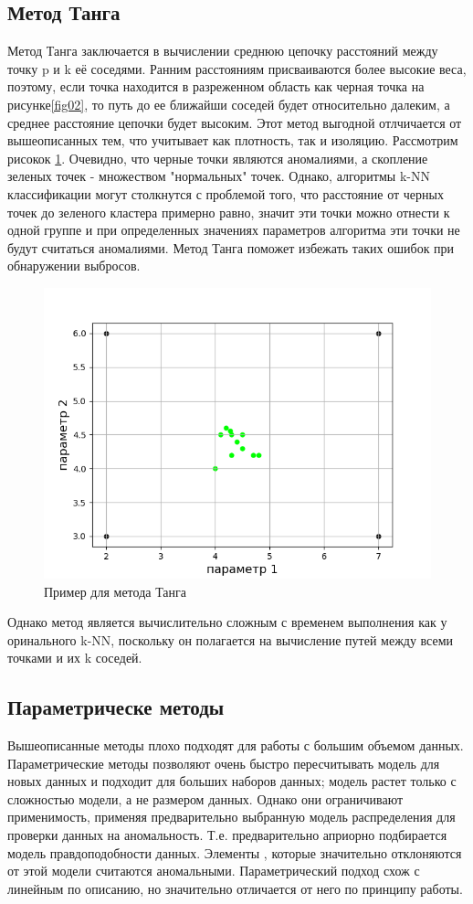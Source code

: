 \subsection{Метод Танга}
Метод Танга заключается  в вычислении среднюю цепочку расстояний между точку p и k её соседями. Ранним расстояниям присваиваются более высокие веса, поэтому, если точка находится в разреженном
область как черная точка на рисунке\ref{fig02}, то путь до  ее ближайши соседей  будет относительно далеким, а среднее расстояние цепочки
будет высоким. Этот метод выгодной отлчичается от вышеописанных тем, что учитывает как  плотность, так и изоляцию. Рассмотрим рисокок \ref{fig03}.
Очевидно, что черные точки являются аномалиями, а скопление зеленых точек - множеством "нормальных" точек. Однако, алгоритмы k-NN классификации могут столкнутся с проблемой того, что расстояние от черных точек до зеленого кластера примерно равно, значит эти точки можно отнести к одной группе и при определенных значениях параметров алгоритма эти точки не будут считаться аномалиями. Метод Танга поможет избежать таких ошибок при обнаружении выбросов.
\begin{figure}
	\centering
	\includegraphics[width=.5\textwidth]{img/3.png}
	\caption{Пример для метода Танга}
	\label{fig03}
\end{figure}
 Однако метод является вычислительно сложным с временем выполнения как у оринального k-NN, поскольку он полагается на вычисление путей между всеми точками и их k соседей. 
\subsection{Параметрическе методы}
Вышеописанные методы плохо подходят для работы с большим объемом данных.
Параметрические методы позволяют очень быстро пересчитывать модель для
новых данных и подходит для больших наборов данных; модель растет
только с сложностью модели, а не размером данных. Однако они ограничивают
применимость,  применяя предварительно выбранную модель распределения для проверки данных на аномальность. Т.е. предварительно априорно подбирается модель правдоподобности данных. Элементы , которые значительно отклоняются от этой модели считаются аномальными. Параметрический подход схож с линейным по описанию, но значительно отличается от него по принципу работы.

